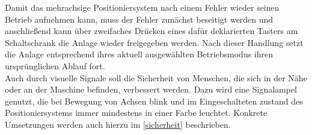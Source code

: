 \documentclass[../../../Bachelorarbeit.tex]{subfiles}
\begin{document}
Damit das mehrachsige Positioniersystem nach einem Fehler wieder seinen Betrieb aufnehmen kann, muss der Fehler zunächst beseitigt werden und anschließend kann über zweifaches Drücken eines dafür deklarierten Tasters am Schaltschrank die Anlage wieder freigegeben werden. Nach dieser Handlung setzt die Anlage entsprechend ihres aktuell ausgewählten Betriebsmodus ihren ursprünglichen Ablauf fort.\\
Auch durch visuelle Signale soll die Sicherheit von Menschen, die sich in der Nähe oder an der Maschine befinden, verbessert werden. Dazu wird eine Signalampel genutzt, die bei Bewegung von Achsen blink und im Eingeschalteten zustand des Positioniersystems immer mindestens in einer Farbe leuchtet. Konkrete Umsetzungen werden auch hierzu im \autoref{sicherheit} beschrieben.
\end{document}
